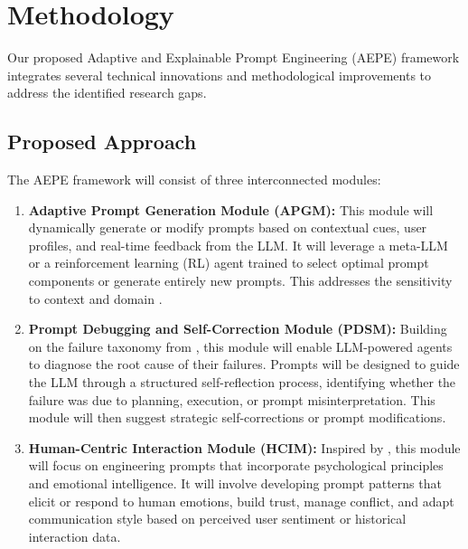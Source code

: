 \documentclass{article}
\begin{document}
\section{Methodology}
Our proposed Adaptive and Explainable Prompt Engineering (AEPE) framework integrates several technical innovations and methodological improvements to address the identified research gaps.

\subsection{Proposed Approach}
The AEPE framework will consist of three interconnected modules:
\begin{enumerate}[label=\arabic*.]
    \item \textbf{Adaptive Prompt Generation Module (APGM):} This module will dynamically generate or modify prompts based on contextual cues, user profiles, and real-time feedback from the LLM. It will leverage a meta-LLM or a reinforcement learning (RL) agent trained to select optimal prompt components or generate entirely new prompts. This addresses the sensitivity to context and domain \cite{paper5}.
    \item \textbf{Prompt Debugging and Self-Correction Module (PDSM):} Building on the failure taxonomy from \cite{paper1}, this module will enable LLM-powered agents to diagnose the root cause of their failures. Prompts will be designed to guide the LLM through a structured self-reflection process, identifying whether the failure was due to planning, execution, or prompt misinterpretation. This module will then suggest strategic self-corrections or prompt modifications.
    \item \textbf{Human-Centric Interaction Module (HCIM):} Inspired by \cite{paper2}, this module will focus on engineering prompts that incorporate psychological principles and emotional intelligence. It will involve developing prompt patterns that elicit or respond to human emotions, build trust, manage conflict, and adapt communication style based on perceived user sentiment or historical interaction data.
\end{enumerate}
\end{document}
